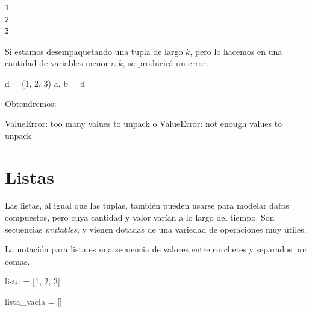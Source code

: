 \documentclass[
  letterpaper,
  DIV=11,
  numbers=noendperiod]{scrreprt}
\newenvironment{Shaded}{\begin{snugshade}}{\end{snugshade}}
\newcommand{\DecValTok}[1]{\textcolor[rgb]{0.68,0.00,0.00}{#1}}
\newcommand{\NormalTok}[1]{\textcolor[rgb]{0.00,0.23,0.31}{#1}}
\newcommand{\OperatorTok}[1]{\textcolor[rgb]{0.37,0.37,0.37}{#1}}
\begin{document}
\begin{verbatim}
1
2
3
\end{verbatim}

\begin{tcolorbox}[enhanced jigsaw, arc=.35mm, toptitle=1mm, colframe=quarto-callout-warning-color-frame, bottomtitle=1mm, opacitybacktitle=0.6, colbacktitle=quarto-callout-warning-color!10!white, leftrule=.75mm, coltitle=black, toprule=.15mm, titlerule=0mm, title=\textcolor{quarto-callout-warning-color}{\faExclamationTriangle}\hspace{0.5em}{¡Cuidado!}, bottomrule=.15mm, rightrule=.15mm, colback=white, breakable, opacityback=0, left=2mm]

Si estamos desempaquetando una tupla de largo \(k\), pero lo hacemos en
una cantidad de variables menor a \(k\), se producirá un error.

\begin{Shaded}
\begin{Highlighting}[]
\NormalTok{d }\OperatorTok{=}\NormalTok{ (}\DecValTok{1}\NormalTok{, }\DecValTok{2}\NormalTok{, }\DecValTok{3}\NormalTok{)}
\NormalTok{a, b }\OperatorTok{=}\NormalTok{ d}
\end{Highlighting}
\end{Shaded}

Obtendremos:

\begin{Shaded}
\begin{Highlighting}[]
\NormalTok{ValueError: too many values to unpack}
\NormalTok{o}
\NormalTok{ValueError: not enough values to unpack}
\end{Highlighting}
\end{Shaded}

\end{tcolorbox}

\section{Listas}\label{listas}

Las listas, al igual que las tuplas, también pueden usarse para modelar
datos compuestos, pero cuya cantidad y valor varían a lo largo del
tiempo. Son secuencias \emph{mutables}, y vienen dotadas de una variedad
de operaciones muy útiles.

La notación para lista es una secuencia de valores entre corchetes y
separados por comas.

\begin{Shaded}
\begin{Highlighting}[]
\NormalTok{lista }\OperatorTok{=}\NormalTok{ [}\DecValTok{1}\NormalTok{, }\DecValTok{2}\NormalTok{, }\DecValTok{3}\NormalTok{]}

\NormalTok{lista\_vacia }\OperatorTok{=}\NormalTok{ []}
\end{Highlighting}
\end{Shaded}
\end{document}
